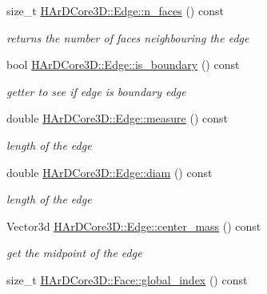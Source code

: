 \begin{DoxyCompactItemize}
size\+\_\+t \hyperlink{group__Mesh_gaab36400cd966cbeec90297f41c14ac55}{H\+Ar\+D\+Core3\+D\+::\+Edge\+::n\+\_\+faces} () const
\begin{DoxyCompactList}\small\item\em returns the number of faces neighbouring the edge \end{DoxyCompactList}\item 
\mbox{\label{group__Mesh_ga2caaa7859e84eab62858ff8c24d261fe}} 
bool \hyperlink{group__Mesh_ga2caaa7859e84eab62858ff8c24d261fe}{H\+Ar\+D\+Core3\+D\+::\+Edge\+::is\+\_\+boundary} () const
\begin{DoxyCompactList}\small\item\em getter to see if edge is boundary edge \end{DoxyCompactList}\item 
\mbox{\label{group__Mesh_ga38609361fcb95fa62e0bf2d5170144aa}} 
double \hyperlink{group__Mesh_ga38609361fcb95fa62e0bf2d5170144aa}{H\+Ar\+D\+Core3\+D\+::\+Edge\+::measure} () const
\begin{DoxyCompactList}\small\item\em length of the edge \end{DoxyCompactList}\item 
\mbox{\label{group__Mesh_ga93672b9685e10344c31cdae234017557}} 
double \hyperlink{group__Mesh_ga93672b9685e10344c31cdae234017557}{H\+Ar\+D\+Core3\+D\+::\+Edge\+::diam} () const
\begin{DoxyCompactList}\small\item\em length of the edge \end{DoxyCompactList}\item 
\mbox{\label{group__Mesh_gac7aee988662d982ab3fd81704af7842c}} 
Vector3d \hyperlink{group__Mesh_gac7aee988662d982ab3fd81704af7842c}{H\+Ar\+D\+Core3\+D\+::\+Edge\+::center\+\_\+mass} () const
\begin{DoxyCompactList}\small\item\em get the midpoint of the edge \end{DoxyCompactList}\item 
\mbox{\label{group__Mesh_ga5cf9000fd94ae2e7ec79245607644f1b}} 
size\+\_\+t \hyperlink{group__Mesh_ga5cf9000fd94ae2e7ec79245607644f1b}{H\+Ar\+D\+Core3\+D\+::\+Face\+::global\+\_\+index} () const

\end{DoxyCompactItemize}
